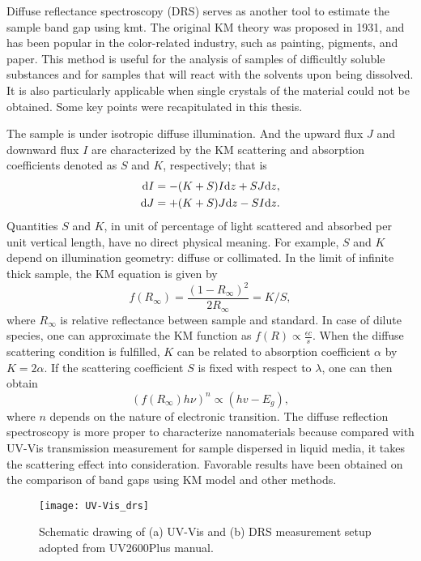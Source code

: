 Diffuse reflectance spectroscopy (DRS) serves as another tool to estimate the sample band gap using \gls{kmt}.\cite{Tandon1970} The original KM theory was proposed in 1931,\cite{Kubelka1931} and has been popular in the color-related industry, such as painting, pigments, and paper. This method is useful for the analysis of samples of difficultly soluble substances and for samples that will react with the solvents upon being dissolved. It is also particularly applicable when single crystals of the material could not be obtained. Some key points were recapitulated in this thesis.

The sample is under isotropic diffuse illumination. And the upward flux $J$ and downward flux $I$ are characterized by the KM scattering and absorption coefficients denoted as $S$ and $K$, respectively; that is
\begin{align}
\mathrm{d} I &= - (K + S)I \mathrm{d} z + SJ\mathrm{d} z,\\
\mathrm{d} J &= + (K + S)J \mathrm{d} z - SI\mathrm{d} z.
\end{align}
Quantities $S$ and $K$, in unit of percentage of light scattered and absorbed per unit vertical length, have no direct physical meaning. For example, $S$ and $K$ depend on illumination geometry: diffuse or collimated. In the limit of infinite thick sample, the KM equation is given by
\begin{equation}
f(R_\infty) = \frac{(1-R_\infty)^2}{2R_\infty} = K/S,
\end{equation}
where $R_\infty$ is relative reflectance between sample and standard. In case of dilute species, one can approximate the KM function as $f(R) \propto \frac{\epsilon c}{s}$. When the diffuse scattering condition is fulfilled, $K$ can be related to absorption coefficient $\alpha$ by $K = 2\alpha$. If the scattering coefficient $S$ is fixed with respect to $\lambda$, one can then obtain
\begin{equation}
(f(R_\infty) h \nu)^n \propto (hv - E_g),
\end{equation}
where $n$ depends on the nature of electronic transition. The diffuse reflection spectroscopy is more proper to characterize nanomaterials because compared with UV-Vis transmission measurement for sample dispersed in liquid media, it takes the scattering effect into consideration. Favorable results have been obtained on the comparison of band gaps using KM model and other methods.\cite{Tandon1970,Morales2007} 

\begin{figure}[htb]
\centering
\texttt{[image: UV-Vis\_drs]}
\caption[Schematic drawing of UV-Vis and DRS measurement]{Schematic drawing of (a) UV-Vis and (b) DRS measurement setup adopted from UV2600Plus manual.}
\label{fig:ch2uvvis}
\end{figure}

